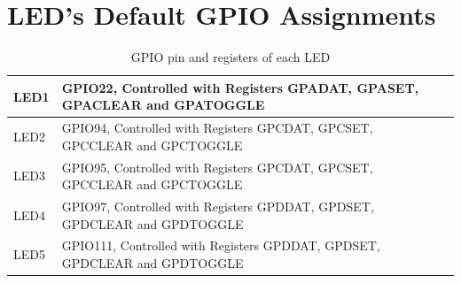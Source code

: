 \documentclass[11pt]{article}
\begin{document}
\section*{LED’s Default GPIO Assignments}
%
\begin{table}[H]
    \centering
    \renewcommand{\arraystretch}{1.2}
    \begin{tabular}{|>{\centering\arraybackslash}p{}|>{\centering\arraybackslash}p{}|}
        \hline
        LED1 & GPIO22, Controlled with Registers GPADAT, GPASET, GPACLEAR and GPATOGGLE \\ \hline
        LED2 & GPIO94, Controlled with Registers GPCDAT, GPCSET, GPCCLEAR and GPCTOGGLE \\ \hline
        LED3 & GPIO95, Controlled with Registers GPCDAT, GPCSET, GPCCLEAR and GPCTOGGLE \\ \hline
        LED4 & GPIO97, Controlled with Registers GPDDAT, GPDSET, GPDCLEAR and GPDTOGGLE \\ \hline
        LED5 & GPIO111, Controlled with Registers GPDDAT, GPDSET, GPDCLEAR and GPDTOGGLE \\ \hline
    \end{tabular}
    \caption{GPIO pin and registers of each LED}
\end{table}
%
\end{document}
